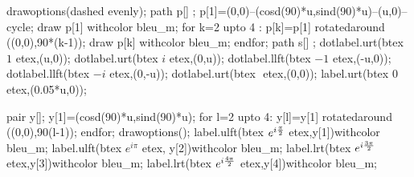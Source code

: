 \documentclass[12pt]{article}
\begin{document}
  drawoptions(dashed evenly);
  path p[] ;
  p[1]=(0,0)--(cosd(90)*u,sind(90)*u)--(u,0)--cycle;
  draw p[1] withcolor  bleu_m;
  for k=2 upto 4 : p[k]=p[1] rotatedaround ((0,0),90*(k-1));
    draw p[k] withcolor bleu_m;
  endfor;
  path s[] ;
dotlabel.urt(btex $1$ etex,(u,0));
dotlabel.urt(btex $i$ etex,(0,u));
dotlabel.llft(btex $-1$ etex,(-u,0));
dotlabel.llft(btex $-i$ etex,(0,-u));
dotlabel.urt(btex $ $ etex,(0,0));
label.urt(btex $0$ etex,(0.05*u,0));



  pair y[];
  y[1]=(cosd(90)*u,sind(90)*u);
  for l=2 upto 4:
    y[l]=y[1] rotatedaround ((0,0),90(l-1));
  endfor;
  drawoptions();
  label.ulft(btex $e^{i{\pi \over 2}}$ etex,y[1])withcolor bleu_m;
  label.ulft(btex $e^{i\pi}$ etex, y[2])withcolor bleu_m;
  label.lrt(btex $e^{i{3\pi \over 2}}$ etex,y[3])withcolor bleu_m;
  label.lrt(btex  $e^{i{4\pi \over 2}}$ etex,y[4])withcolor bleu_m;



\end{document}
